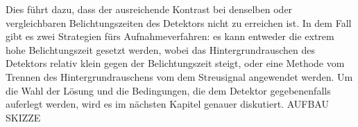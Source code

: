 \noindent
Dies führt dazu, dass der ausreichende Kontrast bei denselben oder vergleichbaren Belichtungszeiten des Detektors nicht zu erreichen ist. In dem Fall gibt es zwei Strategien fürs Aufnahmeverfahren: es kann entweder die extrem hohe Belichtungszeit gesetzt werden, wobei das Hintergrundrauschen des Detektors relativ klein gegen der Belichtungszeit steigt, oder eine Methode vom Trennen des Hintergrundrauschens vom dem Streusignal angewendet werden. Um die Wahl der Lösung und die Bedingungen, die dem Detektor gegebenenfalls auferlegt werden, wird es im nächsten Kapitel genauer diskutiert. AUFBAU SKIZZE
